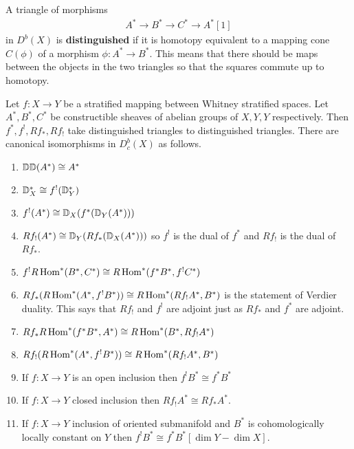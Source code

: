 \documentclass[12pt]{article}
\begin{document}
\begin{definition}
    A triangle of morphisms
    \begin{align*}
        A^* \to B^* \to C^* \to A^*[1]
    \end{align*} in $D^b(X)$ is \textbf{distinguished} if it is homotopy equivalent to a mapping cone 
    $C(\phi)$ of a morphism $\phi:A^*\to B^*$. This means that there should be maps between 
    the objects in the two triangles so that the squares commute up to homotopy.
\end{definition}

\begin{theorem}
     Let $f:X\to Y$ be a 
    stratified mapping between Whitney stratified spaces. Let $A^*,
    B^*,C^*$ be constructible sheaves of abelian groups of $X,Y,Y$ respectively. Then 
    $f^*,f^!,Rf_*,Rf_!$ take distinguished triangles to distinguished triangles. There
    are canonical isomorphisms in $D^b_c(X)$ as follows.

    \begin{enumerate}
        \item $\mathbb{D}\mathbb{D}(A^*) \cong A^*$
        \item $\mathbb{D}^*_X \cong f^!(\mathbb{D}^*_Y)$
        \item $f^!(A^*) \cong \mathbb{D}_X(f^*(\mathbb{D}_Y(A^*)))$
        \item $Rf_!(A^*) \cong \mathbb{D}_Y(Rf_*(\mathbb{D}_X(A^*)))$ so $f^!$ is the dual of $f^*$
        and $Rf_!$ is the dual of $Rf_*$.
        \item $f^!R\operatorname{Hom}^*(B^*,C^*) \cong R\operatorname{Hom}^*(f^*B^*,f^!C^*)$
        \item $Rf_*(R\operatorname{Hom}^*(A^*,f^!B^*)) \cong R\operatorname{Hom}^*(Rf_!A^*,B^*)$ is the statement of Verdier
        duality. This says that $Rf_!$ and $f^!$ are adjoint just as $Rf_*$ and $f^*$ are adjoint.
        \item $Rf_*R\operatorname{Hom}^*(f^*B^*,A^*) \cong R\operatorname{Hom}^*(B^*,Rf_!A^*)$
        \item $Rf_!(R\operatorname{Hom}^*(A^*,f^!B^*)) \cong R\operatorname{Hom}^*(Rf_!A^*,B^*)$
        \item If $f:X\to Y$ is an open inclusion then $f^!B^* \cong f^*B^*$ 
        \item If $f:X\to Y$ closed inclusion then $Rf_!A^* \cong Rf_*A^*$.
        \item If $f:X\to Y$ inclusion of oriented submanifold and $B^*$ is 
        cohomologically locally constant on $Y$ then $f^!B^* \cong f^*B^*[\dim Y - \dim X]$.
    \end{enumerate}
\end{theorem}

{}

\end{document}
